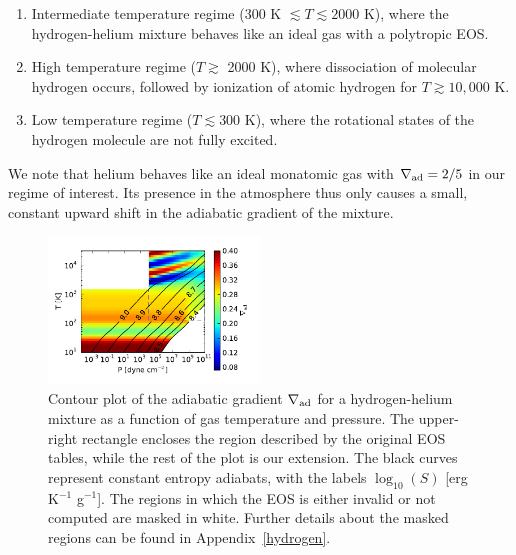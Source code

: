 \documentclass[apj]{emulateapj}
\newcommand{\delad}{\nabla_{\rm ad}}
\newcommand{\App}[1]{Appendix~\ref{#1}}
\begin{document}

\begin{enumerate}
\item Intermediate temperature regime (300 K $\lesssim T \lesssim 2000$ K), where the hydrogen-helium mixture behaves like an ideal gas with a polytropic EOS.
\item High temperature regime ($T \gtrsim$ 2000 K), where dissociation of molecular hydrogen occurs, followed by ionization of atomic hydrogen for $T \gtrsim 10,000$ K.
\item Low temperature regime ($T \lesssim 300$ K), where the rotational states of the hydrogen molecule are not fully excited. %
\end{enumerate}

We note that helium behaves like an ideal monatomic gas with $\delad=2/5$ in our regime of interest.  Its presence in the atmosphere thus only causes a small, constant upward shift in the adiabatic gradient of the mixture.

\begin{figure}[h]
\centering
\includegraphics[width=0.5\textwidth]{../../figs/ModelAtmospheres/RadSelfGravRealEOS/PaperFigs/delad_S_mixt.pdf}
\caption{Contour plot of the adiabatic gradient $\delad$ for a hydrogen-helium mixture as a function of gas temperature and pressure. The upper-right rectangle encloses the region described by the original \citet{saumon95} EOS tables, while the rest of the plot is our extension. The black curves represent constant entropy adiabats, with the labels $\log_{10}(S)$ [erg K$^{-1}$ g$^{-1}$]. The regions in which the EOS is either invalid or not computed are masked in white. Further details about the masked regions can be found in \App{hydrogen}.}
\label{fig:deladmap}
\end{figure}
\end{document}
